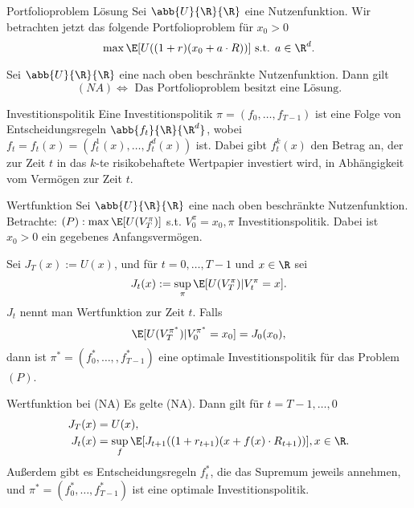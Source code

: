 \begin{karte}{Portfolioproblem Lösung}
Sei \(\abb{U}{\R}{\R}\) eine Nutzenfunktion. 
Wir betrachten jetzt das folgende Portfolioproblem für \(x_0 > 0\)
\[ \max \E[U((1+r)(x_0 + a \cdot R))] \text{ s.t. } a\in \R^d. \]

Sei \(\abb{U}{\R}{\R}\) eine nach oben beschränkte Nutzenfunktion. Dann gilt 
\[ (NA) \Leftrightarrow \text{ Das Portfolioproblem besitzt eine Lösung.} \]
\end{karte}

\begin{karte}{Investitionspolitik}
Eine Investitionspolitik \(\pi = (f_0, \ldots, f_{T-1})\) ist eine Folge 
von Entscheidungsregeln \(\abb{f_t}{\R}{\R^d}\), wobei 
\(f_t = f_t(x) = (f_t^1(x), \ldots, f_t^d(x))\) ist. 
Dabei gibt \(f_t^k(x)\) den Betrag an, der zur Zeit \(t\) in das 
\(k\)-te risikobehaftete Wertpapier investiert wird, in Abhängigkeit vom 
Vermögen zur Zeit \(t\).
\end{karte}

\begin{karte}{Wertfunktion}
Sei \(\abb{U}{\R}{\R}\) eine nach oben beschränkte Nutzenfunktion. Betrachte: 
\((P): \max \E[U(V_T^\pi)]\) s.t. \(V_0^\pi = x_0, \pi\) Investitionspolitik.
Dabei ist \(x_0 > 0\) ein gegebenes Anfangsvermögen.

Sei \(J_T(x) := U(x)\), und für \(t=0,\ldots, T-1\) und \(x\in\R\) sei 
\[ J_t(x) := \sup_\pi \E[U(V_T^\pi) | V_t^\pi = x]. \]
\(J_t\) nennt man Wertfunktion zur Zeit \(t\). Falls 
\[ \E[U(V_T^{\pi^*}) | V_0^{\pi^*} = x_0] = J_0(x_0), \]
dann ist \(\pi^* = (f_0^*, \ldots, ,f_{T-1}^*)\) eine optimale Investitionspolitik für 
das Problem \((P)\).
\end{karte}

\begin{karte}{Wertfunktion bei (NA)}
Es gelte (NA). Dann gilt für \(t=T-1, \ldots, 0\)
\begin{align*}
    J_T(x) &= U(x), \\
    J_t(x) &= \sup_f \E[ J_{t+1}((1+r_{t+1}) (x + f(x) \cdot R_{t+1})) ], x\in \R.
\end{align*}
Außerdem gibt es Entscheidungsregeln \(f_t^*\), die das Supremum jeweils annehmen, und 
\(\pi^* = (f_0^*, \ldots, f_{T-1}^*)\) ist eine optimale Investitionspolitik.
\end{karte}